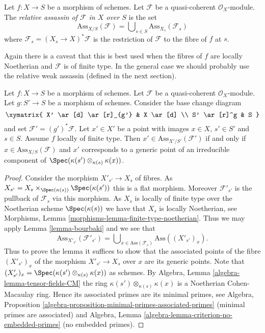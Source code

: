 \begin{definition}
\label{definition-relative-assassin}
Let $f : X \to S$ be a morphism of schemes.
Let $\mathcal{F}$ be a quasi-coherent $\mathcal{O}_X$-module.
The {\it relative assassin of $\mathcal{F}$ in $X$ over $S$}
is the set
$$
\text{Ass}_{X/S}(\mathcal{F}) =
\bigcup\nolimits_{s \in S} \text{Ass}_{X_s}(\mathcal{F}_s)
$$
where $\mathcal{F}_s = (X_s \to X)^*\mathcal{F}$ is the restriction
of $\mathcal{F}$ to the fibre of $f$ at $s$.
\end{definition}

\noindent
Again there is a caveat that this is best used when the fibres of $f$
are locally Noetherian and $\mathcal{F}$ is of finite type. In the general
case we should probably use the relative weak assassin (defined in the next
section).

\begin{lemma}
\label{lemma-base-change-relative-assassin}
Let $f : X \to S$ be a morphism of schemes.
Let $\mathcal{F}$ be a quasi-coherent $\mathcal{O}_X$-module.
Let $g : S' \to S$ be a morphism of schemes.
Consider the base change diagram
$$
\xymatrix{
X' \ar[d] \ar[r]_{g'} & X \ar[d] \\
S' \ar[r]^g & S
}
$$
and set $\mathcal{F}' = (g')^*\mathcal{F}$. Let $x' \in X'$ be a point
with images $x \in X$, $s' \in S'$ and $s \in S$.
Assume $f$ locally of finite type.
Then $x' \in \text{Ass}_{X'/S'}(\mathcal{F}')$ if and only if
$x \in \text{Ass}_{X/S}(\mathcal{F})$ and $x'$ corresponds to
a generic point of an irreducible component of
$\Spec(\kappa(s') \otimes_{\kappa(s)} \kappa(x))$.
\end{lemma}

\begin{proof}
Consider the morphism $X'_{s'} \to X_s$ of fibres. As
$X_{s'} = X_s \times_{\Spec(\kappa(s))} \Spec(\kappa(s'))$
this is a flat morphism. Moreover $\mathcal{F}'_{s'}$ is the pullback
of $\mathcal{F}_s$ via this morphism. As $X_s$ is locally of finite
type over the Noetherian scheme $\Spec(\kappa(s))$ we have that
$X_s$ is locally Noetherian, see
Morphisms, Lemma \ref{morphisms-lemma-finite-type-noetherian}.
Thus we may apply
Lemma \ref{lemma-bourbaki}
and we see that
$$
\text{Ass}_{X'_{s'}}(\mathcal{F}'_{s'}) =
\bigcup\nolimits_{x \in \text{Ass}(\mathcal{F}_s)} \text{Ass}((X'_{s'})_x).
$$
Thus to prove the lemma it suffices to show that the associated points
of the fibre $(X'_{s'})_x$ of the morphism $X'_{s'} \to X_s$ over $x$
are its generic points. Note that
$(X'_{s'})_x = \Spec(\kappa(s') \otimes_{\kappa(s)} \kappa(x))$
as schemes. By
Algebra, Lemma \ref{algebra-lemma-tensor-fields-CM}
the ring $\kappa(s') \otimes_{\kappa(s)} \kappa(x)$ is a Noetherian
Cohen-Macaulay ring. Hence its associated primes are its minimal primes, see
Algebra, Proposition \ref{algebra-proposition-minimal-primes-associated-primes}
(minimal primes are associated) and
Algebra, Lemma \ref{algebra-lemma-criterion-no-embedded-primes}
(no embedded primes).
\end{proof}

